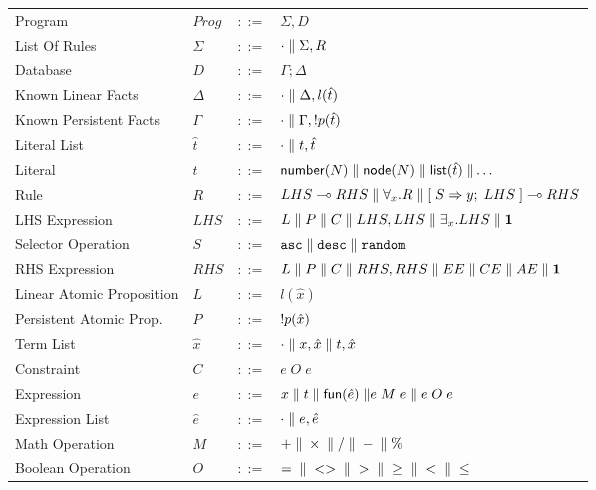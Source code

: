 \begin{table}[h]
\centering
\begin{tabular}{ l l c l }
  Program & $Prog$ & $::=$ & $\Sigma, D$ \\
  List Of Rules & $\Sigma$ & $::=$ & $\cdot \; \Vert \; \Sigma, R$\\
  Database & $D$ & $::=$ & $\Gamma; \Delta$ \\
  Known Linear Facts & $\Delta$ & $::=$ & $\cdot \; \Vert \; \Delta, l(\hat{t})$ \\
  Known Persistent Facts & $\Gamma$ & $::=$ & $\cdot \; \Vert \; \Gamma, {!} p(\hat{t})$ \\

  Literal List & $\hat{t}$ & $::=$ & $\cdot \; \Vert \; t, \hat{t}$ \\
  Literal & $t$ & $::=$ & $\mathsf{number}(N) \; \Vert \; \mathsf{node}(N) \; \Vert \; \mathsf{list}(\hat{t}) \; \Vert \ldots$ \\
  Rule & $R$ & $::=$ & $LHS \multimap RHS \; \Vert \; \forall_{x}. R \; \Vert \;
  [\; S \Rightarrow y; \; LHS \;] \multimap RHS$ \\
  LHS Expression & $LHS$ & $::=$ & $L \; \Vert \; P \; \Vert \; C \; \Vert \; LHS,
  LHS \; \Vert \; \exists_{x}. LHS \; \Vert \; \mathbf{1}$\\
  Selector Operation & $S$ & $::=$ & $\mathtt{asc} \; \Vert \; \mathtt{desc} \; \Vert \; \mathtt{random}$\\
  RHS Expression & $RHS$ & $::=$ & $L \; \Vert \; P \; \Vert \; C \; \Vert \; RHS, RHS \; \Vert
  \; EE \; \Vert \; CE \; \Vert \; AE \; \Vert \; \mathbf{1}$\\
  
  Linear Atomic Proposition & $L$ & $::=$ & $l(\hat{x})$\\
  Persistent Atomic Prop. & $P$ & $::=$ & ${!} p(\hat{x})$\\
  Term List & $\hat{x}$ & $::=$ & $\cdot \; \Vert \; x, \hat{x} \; \Vert \; t, \hat{x}$ \\
  Constraint & $C$ & $::=$ & $e \; O \; e$ \\
  Expression & $e$ & $::=$ & $x \; \Vert \; t \; \Vert \; \mathsf{fun}(\hat{e}) \; \Vert
  e \; M \; e \; \Vert \; e \; O \; e$ \\
  Expression List & $\hat{e}$ & $::=$ & $\cdot \; \Vert \; e, \hat{e}$ \\
  Math Operation & $M$ & $::=$ & $+ \; \Vert \; \times \; \Vert \; / \; \Vert \; - \; \Vert \; \%$ \\
  Boolean Operation & $O$ & $::=$ & $= \; \Vert \; <> \; \Vert \; > \; \Vert \;
  \geq \; \Vert \; < \; \Vert \; \leq $ \\


\end{tabular}
\end{table}
